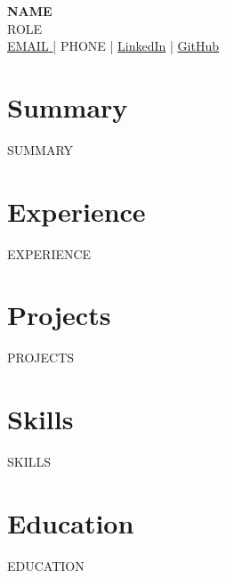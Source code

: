 \documentclass[10pt,a4paper]{article}
\begin{document}
\begin{center}
    {\huge \textbf{{{NAME}}}} \\
    \vspace{2mm}
    {\large {{ROLE}}} \\
    \vspace{2mm}
    \href{mailto:{{EMAIL}}}{ {{EMAIL}} } | {{PHONE}} | \href{ {{LINKEDIN}} }{LinkedIn} | \href{ {{GITHUB}} }{GitHub}
\end{center}

\vspace{2mm}
\section*{Summary}
{{SUMMARY}}

\section*{Experience}
{{EXPERIENCE}}

\section*{Projects}
{{PROJECTS}}

\section*{Skills}
{{SKILLS}}

\section*{Education}
{{EDUCATION}}
\end{document}

